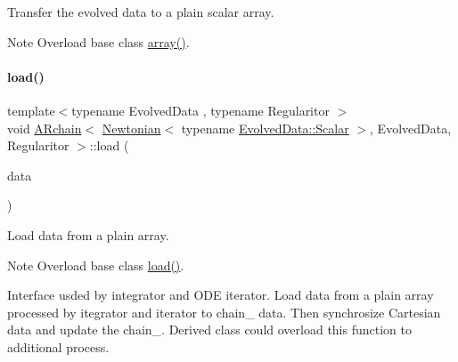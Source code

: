 Transfer the evolved data to a plain scalar array. 

\begin{DoxyNote}{Note}
Overload base class \mbox{\hyperlink{class_a_rchain_3_01_newtonian_3_01typename_01_evolved_data_1_1_scalar_01_4_00_01_evolved_data_00_01_regularitor_01_4_a919d200a913f75719c7240c030b9b113}{array()}}. 
\end{DoxyNote}
\mbox{\label{class_a_rchain_3_01_newtonian_3_01typename_01_evolved_data_1_1_scalar_01_4_00_01_evolved_data_00_01_regularitor_01_4_a8e7bc5b32dbd7a0c9c3541f17fa54e28}} 
\paragraph{\texorpdfstring{load()}{load()}}
{\footnotesize\ttfamily template$<$typename Evolved\+Data , typename Regularitor $>$ \\
void \mbox{\hyperlink{class_a_rchain}{A\+Rchain}}$<$ \mbox{\hyperlink{class_newtonian}{Newtonian}}$<$ typename \mbox{\hyperlink{class_a_rchain_a707e42a79e4744424a34c9007e84ee07}{Evolved\+Data\+::\+Scalar}} $>$, Evolved\+Data, Regularitor $>$\+::load (\begin{DoxyParamCaption}\item[{\mbox{\hyperlink{class_a_rchain_3_01_newtonian_3_01typename_01_evolved_data_1_1_scalar_01_4_00_01_evolved_data_00_01_regularitor_01_4_a8cf940df8dabb6c78662f839c2b13c9a}{Plain\+Array}} \&}]{data }\end{DoxyParamCaption})}



Load data from a plain array. 

\begin{DoxyNote}{Note}
Overload base class \mbox{\hyperlink{class_a_rchain_3_01_newtonian_3_01typename_01_evolved_data_1_1_scalar_01_4_00_01_evolved_data_00_01_regularitor_01_4_a8e7bc5b32dbd7a0c9c3541f17fa54e28}{load()}}.
\end{DoxyNote}
Interface usded by integrator and O\+DE iterator. Load data from a plain array processed by itegrator and iterator to chain_ data. Then synchrosize Cartesian data and update the chain_. Derived class could overload this function to additional process.


